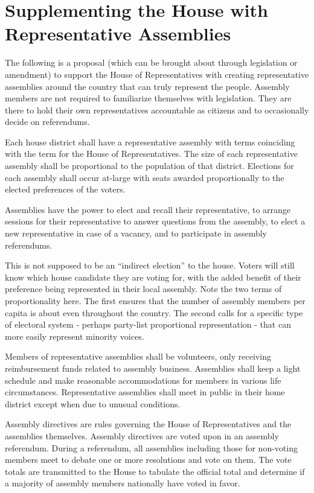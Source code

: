 \documentclass{article}
\begin{document}
\appendix
\section{Supplementing the House with Representative Assemblies}
\label{appendix:house}

The following is a proposal (which can be brought about through legislation or amendment) to support the House of Representatives with creating representative assemblies around the country that can truly represent the people. Assembly members are not required to familiarize themselves with legislation. They are there to hold their own representatives accountable as citizens and to occasionally decide on referendums.

\begin{quoting}
Each house district shall have a representative assembly with terms coinciding with the term for the House of Representatives. The size of each representative assembly shall be proportional to the population of that district. Elections for each assembly shall occur at-large with seats awarded proportionally to the elected preferences of the voters.

Assemblies have the power to elect and recall their representative, to arrange sessions for their representative to answer questions from the assembly, to elect a new representative in case of a vacancy, and to participate in assembly referendums.
\end{quoting}

This is not supposed to be an “indirect election” to the house. Voters will still know which house candidate they are voting for, with the added benefit of their preference being represented in their local assembly. Note the two terms of proportionality here. The first ensures that the number of assembly members per capita is about even throughout the country. The second calls for a specific type of electoral system - perhaps party-list proportional representation - that can more easily represent minority voices.

\begin{quoting}
Members of representative assemblies shall be volunteers, only receiving reimbursement funds related to assembly business. Assemblies shall keep a light schedule and make reasonable accommodations for members in various life circumstances. Representative assemblies shall meet in public in their home district except when due to unusual conditions.

Assembly directives are rules governing the House of Representatives and the assemblies themselves. Assembly directives are voted upon in an assembly referendum. During a referendum, all assemblies including those for non-voting members meet to debate one or more resolutions and vote on them. The vote totals are transmitted to the House to tabulate the official total and determine if a majority of assembly members nationally have voted in favor.
\end{quoting}
\end{document}
